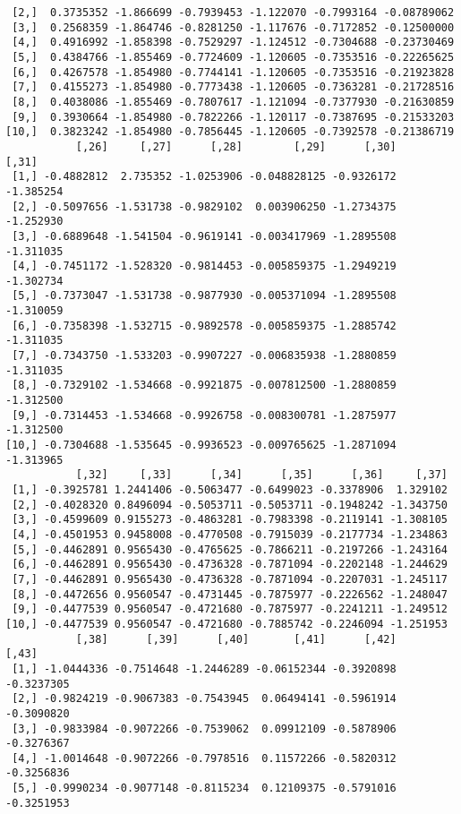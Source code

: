 \documentclass[
  letterpaper,
  DIV=11,
  numbers=noendperiod]{scrreprt}
\begin{document}
\begin{verbatim}
 [2,]  0.3735352 -1.866699 -0.7939453 -1.122070 -0.7993164 -0.08789062
 [3,]  0.2568359 -1.864746 -0.8281250 -1.117676 -0.7172852 -0.12500000
 [4,]  0.4916992 -1.858398 -0.7529297 -1.124512 -0.7304688 -0.23730469
 [5,]  0.4384766 -1.855469 -0.7724609 -1.120605 -0.7353516 -0.22265625
 [6,]  0.4267578 -1.854980 -0.7744141 -1.120605 -0.7353516 -0.21923828
 [7,]  0.4155273 -1.854980 -0.7773438 -1.120605 -0.7363281 -0.21728516
 [8,]  0.4038086 -1.855469 -0.7807617 -1.121094 -0.7377930 -0.21630859
 [9,]  0.3930664 -1.854980 -0.7822266 -1.120117 -0.7387695 -0.21533203
[10,]  0.3823242 -1.854980 -0.7856445 -1.120605 -0.7392578 -0.21386719
           [,26]     [,27]      [,28]        [,29]      [,30]     [,31]
 [1,] -0.4882812  2.735352 -1.0253906 -0.048828125 -0.9326172 -1.385254
 [2,] -0.5097656 -1.531738 -0.9829102  0.003906250 -1.2734375 -1.252930
 [3,] -0.6889648 -1.541504 -0.9619141 -0.003417969 -1.2895508 -1.311035
 [4,] -0.7451172 -1.528320 -0.9814453 -0.005859375 -1.2949219 -1.302734
 [5,] -0.7373047 -1.531738 -0.9877930 -0.005371094 -1.2895508 -1.310059
 [6,] -0.7358398 -1.532715 -0.9892578 -0.005859375 -1.2885742 -1.311035
 [7,] -0.7343750 -1.533203 -0.9907227 -0.006835938 -1.2880859 -1.311035
 [8,] -0.7329102 -1.534668 -0.9921875 -0.007812500 -1.2880859 -1.312500
 [9,] -0.7314453 -1.534668 -0.9926758 -0.008300781 -1.2875977 -1.312500
[10,] -0.7304688 -1.535645 -0.9936523 -0.009765625 -1.2871094 -1.313965
           [,32]     [,33]      [,34]      [,35]      [,36]     [,37]
 [1,] -0.3925781 1.2441406 -0.5063477 -0.6499023 -0.3378906  1.329102
 [2,] -0.4028320 0.8496094 -0.5053711 -0.5053711 -0.1948242 -1.343750
 [3,] -0.4599609 0.9155273 -0.4863281 -0.7983398 -0.2119141 -1.308105
 [4,] -0.4501953 0.9458008 -0.4770508 -0.7915039 -0.2177734 -1.234863
 [5,] -0.4462891 0.9565430 -0.4765625 -0.7866211 -0.2197266 -1.243164
 [6,] -0.4462891 0.9565430 -0.4736328 -0.7871094 -0.2202148 -1.244629
 [7,] -0.4462891 0.9565430 -0.4736328 -0.7871094 -0.2207031 -1.245117
 [8,] -0.4472656 0.9560547 -0.4731445 -0.7875977 -0.2226562 -1.248047
 [9,] -0.4477539 0.9560547 -0.4721680 -0.7875977 -0.2241211 -1.249512
[10,] -0.4477539 0.9560547 -0.4721680 -0.7885742 -0.2246094 -1.251953
           [,38]      [,39]      [,40]       [,41]      [,42]      [,43]
 [1,] -1.0444336 -0.7514648 -1.2446289 -0.06152344 -0.3920898 -0.3237305
 [2,] -0.9824219 -0.9067383 -0.7543945  0.06494141 -0.5961914 -0.3090820
 [3,] -0.9833984 -0.9072266 -0.7539062  0.09912109 -0.5878906 -0.3276367
 [4,] -1.0014648 -0.9072266 -0.7978516  0.11572266 -0.5820312 -0.3256836
 [5,] -0.9990234 -0.9077148 -0.8115234  0.12109375 -0.5791016 -0.3251953

\end{verbatim}
\end{document}
